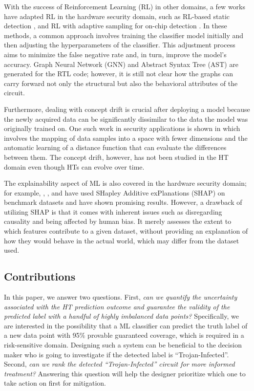 With the success of Reinforcement Learning (RL) in other domains, a few works have adapted RL in the hardware security domain, such as RL-based static detection \cite{gohil2022attrition}, and RL with adaptive sampling for on-chip detection \cite{chen2023adatest}. In these methods, a common approach involves training the classifier model initially and then adjusting the hyperparameters of the classifier. This adjustment process aims to minimize the false negative rate and, in turn, improve the model's accuracy. Graph Neural Network (GNN) \cite{alrahis2022embracing,hepp2022golden} and Abstract Syntax Tree (AST) \cite{han2019hardware} are generated for the RTL code; however, it is still not clear how the graphs can carry forward not only the structural but also the behavioral attributes of the circuit.

Furthermore, dealing with concept drift is crucial after deploying a model because the newly acquired data can be significantly dissimilar to the data the model was originally trained on. One such work in security applications is shown in \cite{yang2021cade} which involves the mapping of data samples into a space with fewer dimensions and the automatic learning of a distance function that can evaluate the differences between them. The concept drift, however, has not been studied in the HT domain even though HTs can evolve over time.

The explainability aspect of ML is also covered in the hardware security domain; for example, \cite{pan2023hardware}, \cite{downing2021deepreflect}, and \cite{severi2021explanation} have used SHapley Additive exPlanations (SHAP) on benchmark datasets and have shown promising results. However, a drawback of utilizing SHAP is that it comes with inherent issues such as disregarding causality and being affected by human bias. It merely assesses the extent to which features contribute to a given dataset, without providing an explanation of how they would behave in the actual world, which may differ from the dataset used.

\subsection*{Contributions}
\label{Contribution}
In this paper, we answer two questions. First, \textit{can we quantify the uncertainty associated with the HT prediction outcome and guarantee the validity of the predicted label with a handful of highly imbalanced data points? } Specifically, we are interested in the possibility that a ML classifier can predict the truth label of a new data point with 95\% provable guaranteed coverage, which is required in a risk-sensitive domain. Designing such a system can be beneficial to the decision maker who is going to investigate if the detected label is ``Trojan-Infected''. Second, \textit{can we rank the detected ``Trojan-Infected'' circuit for more informed treatment?} Answering this question will help the designer prioritize which one to take action on first for mitigation.

